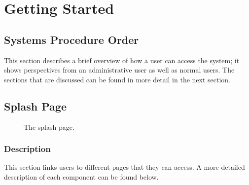 \documentclass[14pt, a4paper]{article}
\begin{document}
\section{Getting Started}
\subsection{Systems Procedure Order}
	This section describes a brief overview of how a user can access the system; it shows perspectives from an administrative user as well as normal users. The sections that are discussed can be found in more detail in the next section.
\subsection{Splash Page}
	\begin{figure}[H]
		\caption{The splash page.}
		\label{fig:splash1}
	\end{figure}
	\subsubsection{Description}
		This section links users to different pages that they can access. A more detailed description of each component can be found below.
\end{document}
